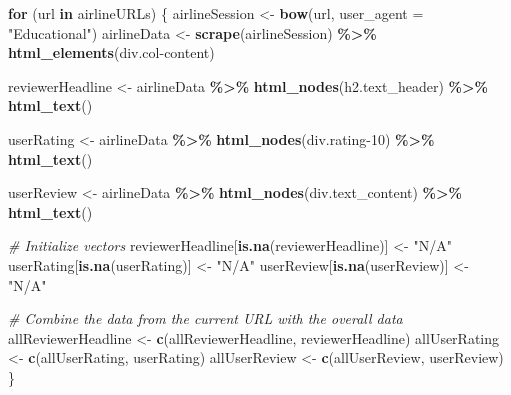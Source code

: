 \documentclass[
]{article}
\newenvironment{Shaded}{\begin{snugshade}}{\end{snugshade}}
\newcommand{\AttributeTok}[1]{\textcolor[rgb]{0.13,0.29,0.53}{#1}}
\newcommand{\CommentTok}[1]{\textcolor[rgb]{0.56,0.35,0.01}{\textit{#1}}}
\newcommand{\ControlFlowTok}[1]{\textcolor[rgb]{0.13,0.29,0.53}{\textbf{#1}}}
\newcommand{\FunctionTok}[1]{\textcolor[rgb]{0.13,0.29,0.53}{\textbf{#1}}}
\newcommand{\NormalTok}[1]{#1}
\newcommand{\OtherTok}[1]{\textcolor[rgb]{0.56,0.35,0.01}{#1}}
\newcommand{\SpecialCharTok}[1]{\textcolor[rgb]{0.81,0.36,0.00}{\textbf{#1}}}
\newcommand{\StringTok}[1]{\textcolor[rgb]{0.31,0.60,0.02}{#1}}
\begin{document}
\begin{Shaded}
\begin{Highlighting}[]
\ControlFlowTok{for}\NormalTok{ (url }\ControlFlowTok{in}\NormalTok{ airlineURLs) \{}
\NormalTok{  airlineSession }\OtherTok{\textless{}{-}} \FunctionTok{bow}\NormalTok{(url, }\AttributeTok{user\_agent =} \StringTok{"Educational"}\NormalTok{)}
\NormalTok{  airlineData }\OtherTok{\textless{}{-}} \FunctionTok{scrape}\NormalTok{(airlineSession) }\SpecialCharTok{\%\textgreater{}\%}
    \FunctionTok{html\_elements}\NormalTok{(}\StringTok{\textquotesingle{}div.col{-}content\textquotesingle{}}\NormalTok{)}
  
\NormalTok{  reviewerHeadline }\OtherTok{\textless{}{-}}\NormalTok{ airlineData }\SpecialCharTok{\%\textgreater{}\%}
    \FunctionTok{html\_nodes}\NormalTok{(}\StringTok{\textquotesingle{}h2.text\_header\textquotesingle{}}\NormalTok{) }\SpecialCharTok{\%\textgreater{}\%}
    \FunctionTok{html\_text}\NormalTok{()}
  
\NormalTok{  userRating }\OtherTok{\textless{}{-}}\NormalTok{ airlineData }\SpecialCharTok{\%\textgreater{}\%}
    \FunctionTok{html\_nodes}\NormalTok{(}\StringTok{\textquotesingle{}div.rating{-}10\textquotesingle{}}\NormalTok{) }\SpecialCharTok{\%\textgreater{}\%}
    \FunctionTok{html\_text}\NormalTok{()}
  
\NormalTok{  userReview }\OtherTok{\textless{}{-}}\NormalTok{ airlineData }\SpecialCharTok{\%\textgreater{}\%}
    \FunctionTok{html\_nodes}\NormalTok{(}\StringTok{\textquotesingle{}div.text\_content\textquotesingle{}}\NormalTok{) }\SpecialCharTok{\%\textgreater{}\%}
    \FunctionTok{html\_text}\NormalTok{()}
  
  \CommentTok{\# Initialize vectors}
\NormalTok{  reviewerHeadline[}\FunctionTok{is.na}\NormalTok{(reviewerHeadline)] }\OtherTok{\textless{}{-}} \StringTok{"N/A"}
\NormalTok{  userRating[}\FunctionTok{is.na}\NormalTok{(userRating)] }\OtherTok{\textless{}{-}} \StringTok{"N/A"}
\NormalTok{  userReview[}\FunctionTok{is.na}\NormalTok{(userReview)] }\OtherTok{\textless{}{-}} \StringTok{"N/A"}
  
  \CommentTok{\# Combine the data from the current URL with the overall data}
\NormalTok{  allReviewerHeadline }\OtherTok{\textless{}{-}} \FunctionTok{c}\NormalTok{(allReviewerHeadline, reviewerHeadline)}
\NormalTok{  allUserRating }\OtherTok{\textless{}{-}} \FunctionTok{c}\NormalTok{(allUserRating, userRating)}
\NormalTok{  allUserReview }\OtherTok{\textless{}{-}} \FunctionTok{c}\NormalTok{(allUserReview, userReview)}
\NormalTok{\}}
\end{Highlighting}
\end{Shaded}
\end{document}
